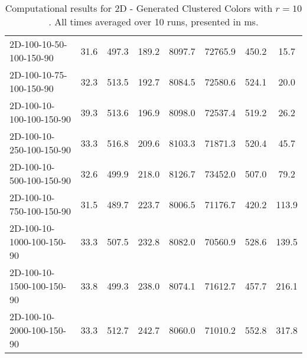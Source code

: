 \documentclass{article}
\begin{document}
\begin{center}
\begin{table}[h]
\begin{tabular}{|l||c|c|c|c|c|c|c|}
    2D-100-10-50-100-150-90 & 31.6 & 497.3 & 189.2 & 8097.7 & 72765.9 & 450.2 & 15.7 \\
    2D-100-10-75-100-150-90 & 32.3 & 513.5 & 192.7 & 8084.5 & 72580.6 & 524.1 & 20.0 \\
    2D-100-10-100-100-150-90 & 39.3 & 513.6 & 196.9 & 8098.0 & 72537.4 & 519.2 & 26.2 \\
    2D-100-10-250-100-150-90 & 33.3 & 516.8 & 209.6 & 8103.3 & 71871.3 & 520.4 & 45.7 \\
    2D-100-10-500-100-150-90 & 32.6 & 499.9 & 218.0 & 8126.7 & 73452.0 & 507.0 & 79.2 \\
    2D-100-10-750-100-150-90 & 31.5 & 489.7 & 223.7 & 8006.5 & 71176.7 & 420.2 & 113.9 \\
    2D-100-10-1000-100-150-90 & 33.3 & 507.5 & 232.8 & 8082.0 & 70560.9 & 528.6 & 139.5 \\
    2D-100-10-1500-100-150-90 & 33.8 & 499.3 & 238.0 & 8074.1 & 71612.7 & 457.7 & 216.1 \\
    2D-100-10-2000-100-150-90 & 33.3 & 512.7 & 242.7 & 8060.0 & 71010.2 & 552.8 & 317.8 \\
    \hline
    \end{tabular}
    \caption{Computational results for 2D - Generated Clustered Colors with $r=10$. All times averaged over 10 runs, presented in ms.}
\end{table}
\end{center}
\end{document}
